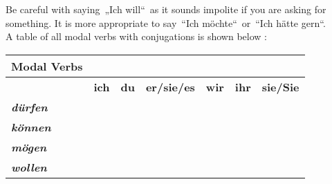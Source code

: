 \documentclass[a4paper,12pt]{article}
\begin{document}
\begin{adjustwidth}{2em}{0pt}
\begin{tabular}{l l}
\end{tabular}
\vspace{0.3cm}
\newline


Be careful with saying „Ich will“ as it sounds impolite if you are asking for
something. It is more appropriate to say “Ich möchte“ or “Ich hätte
gern“.\\

A table of all modal verbs with conjugations is shown below :

\justify

\vspace{0.3cm}
\begin{tabular}{l|c|c|c|c|c|c}

\toprule
\rowcolor{goethe_green}
\multicolumn{7}{c}
{\color{white} \textbf{Modal Verbs} \color{black}} \\
\midrule


&
\cellcolor{lightgray} \textbf{ich} &
\cellcolor{lightgray} \textbf{du} &
\cellcolor{lightgray} \textbf{er/sie/es} &
\cellcolor{lightgray} \textbf{wir} &
\cellcolor{lightgray} \textbf{ihr} &
\cellcolor{lightgray} \textbf{sie/Sie} \\
\midrule

\cellcolor{lightgray} \textbf{\textit{dürfen}} &
\cellcolor{white}                  &
\cellcolor{white}                  &
\cellcolor{white}                  &
\cellcolor{white}                  &
\cellcolor{white}                  &
\cellcolor{white} \\

\cellcolor{lightgray} \textbf{\textit{können}} &
\cellcolor{white}                  &
\cellcolor{white}                  &
\cellcolor{white}                  &
\cellcolor{white}                  &
\cellcolor{white}                  &
\cellcolor{white} \\

\cellcolor{lightgray} \textbf{\textit{mögen}} &
\cellcolor{white}                  &
\cellcolor{white}                  &
\cellcolor{white}                  &
\cellcolor{white}                  &
\cellcolor{white}                  &
\cellcolor{white} \\

\cellcolor{lightgray} \textbf{\textit{wollen}} &
\cellcolor{white}                  &
\cellcolor{white}                  &
\cellcolor{white}                  &
\cellcolor{white}                  &
\cellcolor{white}                  &
\cellcolor{white} \\


\end{tabular}
\end{adjustwidth}
\end{document}
